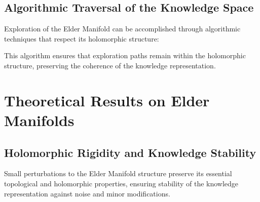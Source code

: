 \subsection{Algorithmic Traversal of the Knowledge Space}

Exploration of the Elder Manifold can be accomplished through algorithmic techniques that respect its holomorphic structure:

\noindent{}

This algorithm ensures that exploration paths remain within the holomorphic structure, preserving the coherence of the knowledge representation.

\section{Theoretical Results on Elder Manifolds}

\subsection{Holomorphic Rigidity and Knowledge Stability}

\begin{theorem}
Small perturbations to the Elder Manifold structure preserve its essential topological and holomorphic properties, ensuring stability of the knowledge representation against noise and minor modifications.
\end{theorem}

